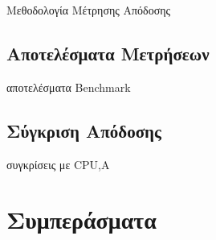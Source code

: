 \documentclass[a4paper,oneside,titlepage,12pt]{article}
\begin{document}
Μεθοδολογία Μέτρησης Απόδοσης

\subsection{Αποτελέσματα Μετρήσεων}

αποτελέσματα Benchmark

\subsection{Σύγκριση Απόδοσης}

συγκρίσεις με CPU,A

\section{Συμπεράσματα}

{}

\end{document}
